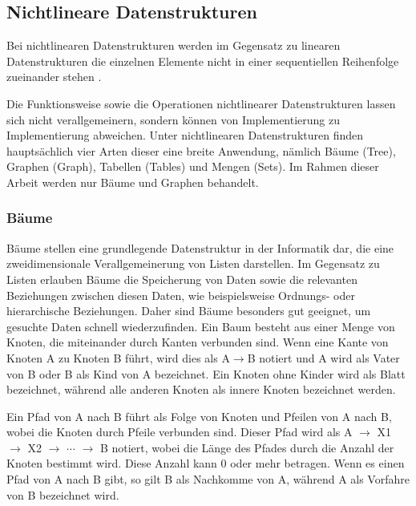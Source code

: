 \subsection{Nichtlineare Datenstrukturen} \label{nicht_lineare_datenstrukturen}
Bei nichtlinearen Datenstrukturen werden im Gegensatz zu linearen Datenstrukturen die einzelnen Elemente nicht in einer sequentiellen Reihenfolge zueinander stehen \autocite[321]{hoffmann_einfuhrung_2011}. 

Die Funktionsweise sowie die Operationen nichtlinearer Datenstrukturen lassen sich nicht verallgemeinern, sondern können von Implementierung zu Implementierung abweichen. Unter nichtlinearen Datenstrukturen finden hauptsächlich vier Arten dieser eine breite Anwendung, nämlich Bäume (Tree), Graphen (Graph), Tabellen (Tables) und Mengen (Sets). Im Rahmen dieser Arbeit werden nur Bäume und Graphen behandelt.

\subsubsection{Bäume}
Bäume stellen eine grundlegende Datenstruktur in der Informatik dar, die eine zweidimensionale Verallgemeinerung von Listen darstellen. Im Gegensatz zu Listen erlauben Bäume die Speicherung von Daten sowie die relevanten Beziehungen zwischen diesen Daten, wie beispielsweise Ordnungs- oder hierarchische Beziehungen. Daher sind Bäume besonders gut geeignet, um gesuchte Daten schnell wiederzufinden. Ein Baum besteht aus einer Menge von Knoten, die miteinander durch Kanten verbunden sind. Wenn eine Kante von Knoten A zu Knoten B führt, wird dies als A$\rightarrow$B notiert und A wird als Vater von B oder B als Kind von A bezeichnet. Ein Knoten ohne Kinder wird als Blatt bezeichnet, während alle anderen Knoten als innere Knoten bezeichnet werden. \autocite[389]{gumm_band_2016}

Ein Pfad von A nach B führt als Folge von Knoten und Pfeilen von A nach B, wobei die Knoten durch Pfeile verbunden sind. Dieser Pfad wird als A $\rightarrow$ X1 $\rightarrow$ X2 $\rightarrow$ $\cdots$ $\rightarrow$ B notiert, wobei die Länge des Pfades durch die Anzahl der Knoten bestimmt wird. Diese Anzahl kann 0 oder mehr betragen. Wenn es einen Pfad von A nach B gibt, so gilt B als Nachkomme von A, während A als Vorfahre von B bezeichnet wird. \autocite[389]{gumm_band_2016}

